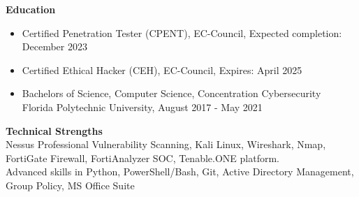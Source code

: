 \documentclass[12pt,a4paper]{article}
\begin{document}
    
    


\textbf{Education}
\begin{itemize}
    \item Certified Penetration Tester (CPENT), EC-Council, Expected completion: December 2023
    \item Certified Ethical Hacker (CEH), EC-Council, Expires: April 2025
    \item Bachelors of Science, Computer Science, Concentration Cybersecurity\\Florida Polytechnic University, August 2017 - May 2021
\end{itemize}


\textbf{Technical Strengths}\\
Nessus Professional Vulnerability Scanning, Kali Linux, Wireshark, Nmap, FortiGate Firewall, FortiAnalyzer SOC, Tenable.ONE platform.\\
Advanced skills in Python, PowerShell/Bash, Git, 
Active Directory Management, Group Policy, MS Office Suite\\
\end{document}
